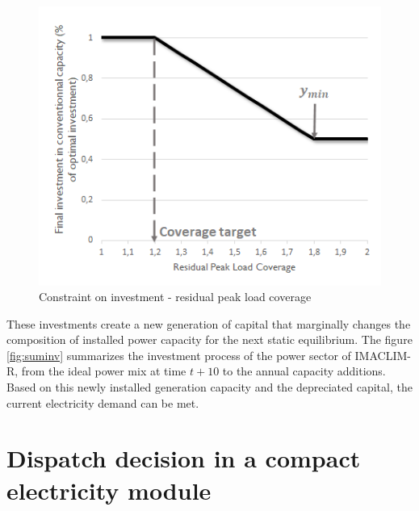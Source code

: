 \begin{figure}[H]
    \centerline{\includegraphics[scale=1]{figures&tables/peak_load_cov.png}} %
    \caption{Constraint on investment - residual peak load coverage}
    \label{fig:peakcov}
\end{figure}

These investments create a new generation of capital that marginally changes the composition of installed power capacity for the next static equilibrium. The figure \ref{fig:suminv} summarizes the investment process of the power sector of IMACLIM-R, from the ideal power mix at time $t+10$ to the annual capacity additions.
Based on this newly installed generation capacity and the depreciated capital, the current electricity demand can be met.




\section{Dispatch decision in a compact electricity module}



